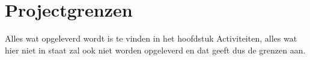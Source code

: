 
\section{Projectgrenzen}
Alles wat opgeleverd wordt is te vinden in het hoofdstuk Activiteiten, alles wat hier niet in staat zal ook niet worden opgeleverd en dat geeft dus de grenzen aan.

\clearpage

